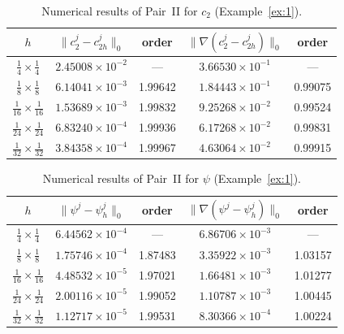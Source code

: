 \documentclass[a4paper,fleqn]{cas-sc}
\numberwithin{equation}{section}
\theoremstyle{definition}
\begin{document}
\begin{table}[htbp]
\centering
\caption{Numerical results of Pair~II for $c_{2}$ (Example~\ref{ex:1}).}
\label{tab:PairII-c2}
\begin{tabular}{ccccc}
\hline
$h$ &
$\|c_{2}^{j} - c_{2h}^{j}\|_{0}$ & order &
$\|\nabla(c_{2}^{j} - c_{2h}^{j})\|_{0}$ & order \\
\hline
$\tfrac{1}{4} \times \tfrac{1}{4}$   & $2.45008\times10^{-2}$ & ---     & $3.66530\times10^{-1}$ & ---     \\
$\tfrac{1}{8} \times \tfrac{1}{8}$   & $6.14041\times10^{-3}$ & 1.99642 & $1.84443\times10^{-1}$ & 0.99075 \\
$\tfrac{1}{16}\times \tfrac{1}{16}$  & $1.53689\times10^{-3}$ & 1.99832 & $9.25268\times10^{-2}$ & 0.99524 \\
$\tfrac{1}{24}\times \tfrac{1}{24}$  & $6.83240\times10^{-4}$ & 1.99936 & $6.17268\times10^{-2}$ & 0.99831 \\
$\tfrac{1}{32}\times \tfrac{1}{32}$  & $3.84358\times10^{-4}$ & 1.99967 & $4.63064\times10^{-2}$ & 0.99915 \\
\hline
\end{tabular}
\end{table}

\begin{table}[htbp]
\centering
\caption{Numerical results of Pair~II for $\psi$ (Example~\ref{ex:1}).}
\label{tab:PairII-psi}
\begin{tabular}{ccccc}
\hline
$h$ &
$\|\psi^{j} - \psi_{h}^{j}\|_{0}$ & order &
$\|\nabla(\psi^{j} - \psi_{h}^{j})\|_{0}$ & order \\
\hline
$\tfrac{1}{4} \times \tfrac{1}{4}$   & $6.44562\times10^{-4}$ & ---     & $6.86706\times10^{-3}$ & ---     \\
$\tfrac{1}{8} \times \tfrac{1}{8}$   & $1.75746\times10^{-4}$ & 1.87483 & $3.35922\times10^{-3}$ & 1.03157 \\
$\tfrac{1}{16}\times \tfrac{1}{16}$  & $4.48532\times10^{-5}$ & 1.97021 & $1.66481\times10^{-3}$ & 1.01277 \\
$\tfrac{1}{24}\times \tfrac{1}{24}$  & $2.00116\times10^{-5}$ & 1.99052 & $1.10787\times10^{-3}$ & 1.00445 \\
$\tfrac{1}{32}\times \tfrac{1}{32}$  & $1.12717\times10^{-5}$ & 1.99531 & $8.30366\times10^{-4}$ & 1.00224 \\
\hline
\end{tabular}
\end{table}
\end{document}
